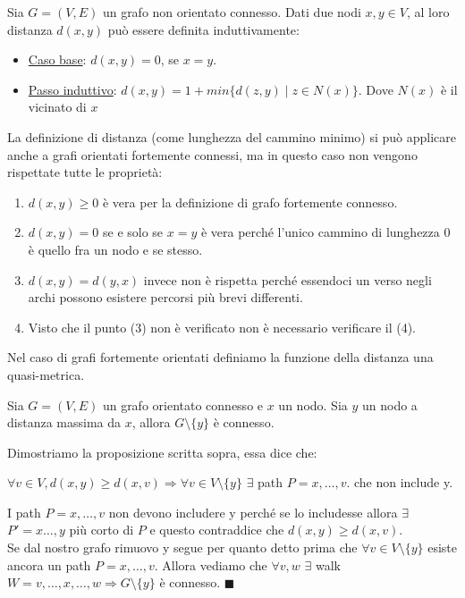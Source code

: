 \begin{definition}
    Sia $G = (V,E)$ un grafo non orientato connesso. Dati due nodi $x,y \in V$, al loro distanza $d(x,y)$ può essere definita induttivamente:
    \begin{itemize}
        \item \underline{Caso base}: $d(x,y) = 0$, se $x = y$.
        \item \underline{Passo induttivo}: $d(x,y) = 1 + min\{d(z,y) \mid z\in N(x)\}$. Dove $N(x)$ è il vicinato di $x$
    \end{itemize}
\end{definition}

La definizione di distanza (come lunghezza del cammino minimo) si può applicare anche a grafi orientati fortemente connessi, ma in questo caso non vengono rispettate tutte le proprietà:
\begin{enumerate}
    \item $d(x,y) \geq 0$ è vera per la definizione di grafo fortemente connesso.
    \item $d(x,y) = 0$ se e solo se $x = y$ è vera perché l'unico cammino di lunghezza $0$ è quello fra un nodo e se stesso.
    \item $d(x,y) = d(y,x)$ invece non è rispetta perché essendoci un verso negli archi possono esistere percorsi più brevi differenti.
    \item Visto che il punto (3) non è verificato non è necessario verificare il (4).
\end{enumerate}
Nel caso di grafi fortemente orientati definiamo la funzione della distanza una quasi-metrica.

\begin{proposition}\label{proposizione-distanza-1}
    Sia $G = (V,E)$ un grafo orientato connesso e $x$ un nodo. Sia $y$ un nodo a distanza massima da $x$, allora $G\setminus \{y\}$ è connesso.
\end{proposition}

\begin{demostration}
    Dimostriamo la proposizione scritta sopra, essa dice che:
    \begin{center}
        $\forall v \in V, d(x,y) \geq d(x,v) \Longrightarrow \forall v \in V \setminus \{y\}$ $\exists$ path $P = x,\ldots,v$. che non include y.
    \end{center}
    I path $P = x,\ldots,v$ non devono includere y perché se lo includesse allora $\exists$ $P' = x\ldots,y$ più corto di $P$ e questo contraddice che $d(x,y) \geq d(x,v)$.\\
    Se dal nostro grafo rimuovo y segue per quanto detto prima che $\forall v \in V \setminus \{y\}$ esiste ancora un path $P = x,\ldots,v$.
    Allora vediamo che $\forall v,w$ $\exists$ walk $W = v,\ldots,x,\ldots,w \Longrightarrow G \setminus \{y\}$ è connesso. $\blacksquare$
\end{demostration}

